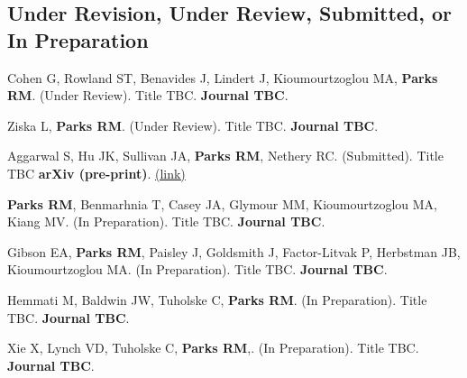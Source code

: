 \subsection*{Under Revision, Under Review, Submitted, or In Preparation}

\noindent Cohen G, Rowland ST, Benavides J, Lindert J, Kioumourtzoglou MA, \textbf{Parks RM}. (Under Review). Title TBC. \textbf{Journal TBC}.\bigskip

\noindent Ziska L, \textbf{Parks RM}. (Under Review). Title TBC. \textbf{Journal TBC}.\bigskip

\noindent Aggarwal S, Hu JK, Sullivan JA, \textbf{Parks RM}, Nethery RC. (Submitted). Title TBC \textbf{arXiv (pre-print)}. \href{https://arxiv.org/abs/2309.13142}{(link)} \bigskip

\noindent \textbf{Parks RM}, Benmarhnia T, Casey JA, Glymour MM, Kioumourtzoglou MA, Kiang MV. (In Preparation). Title TBC. \textbf{Journal TBC}.\bigskip

\noindent Gibson EA, \textbf{Parks RM}, Paisley J, Goldsmith J, Factor-Litvak P, Herbstman JB, Kioumourtzoglou MA. (In Preparation). Title TBC. \textbf{Journal TBC}.\bigskip

\noindent Hemmati M, Baldwin JW, Tuholske C, \textbf{Parks RM}. (In Preparation). Title TBC. \textbf{Journal TBC}.\bigskip

\noindent Xie X, Lynch VD, Tuholske C, \textbf{Parks RM},. (In Preparation). Title TBC. \textbf{Journal TBC}.\bigskip

